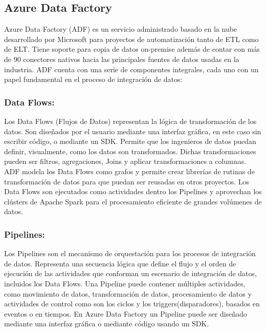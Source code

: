 \subsection{Azure Data Factory}

Azure Data Factory (ADF) es un servicio administrado basado en la nube desarrollado por Microsoft para proyectos de 
automatizaci\'on tanto de ETL como de ELT. Tiene soporte para copia de datos on-premise además de contar con  
m\'as de 90 conectores nativos hacia las principales fuentes de datos usadas en la industria\cite{azure_intro}. ADF cuenta con una 
serie de componentes integrales, cada uno con un papel fundamental en el proceso de integración de datos: 

\subsubsection{Data Flows:}

Los Data Flows (Flujos de Datos) representan la l\'ogica de transformaci\'on de los datos. Son diseñados por el usuario 
mediante una interfaz gr\'afica, en este caso sin escribir c\'odigo, o mediante un SDK. Permite que los ingenieros de 
datos puedan definir, visualmente, como los datos son transformados. Dichas transformaciones pueden ser filtros, 
agregaciones, Joins y aplicar transformaciones a columnas. ADF modela los Data Flows como grafos y permite crear 
librer\'ias de rutinas de transformaci\'on de datos para que puedan ser reusadas en otros proyectos. Los Data Flows 
son ejecutados como actividades dentro los Pipelines y aprovechan los cl\'usters de Apache Spark para el procesamiento 
eficiente de grandes vol\'umenes de datos. 


\subsubsection{Pipelines:}

Los Pipelines son el mecanismo de orquestación para los procesos de integración de datos. Representa una secuencia 
lógica que define el flujo y el orden de ejecución de las actividades que conforman un escenario de integración de datos, 
incluidos los Data Flows. Una Pipeline puede contener múltiples actividades, como movimiento de datos, 
transformación de datos, procesamiento de datos y actividades de control como son los ciclos y los 
triggers(disparadores), basados en eventos o en tiempos. En Azure Data Factory un Pipeline puede ser diseñado 
mediante una interfaz gr\'afica o mediante c\'odigo usando un SDK.

